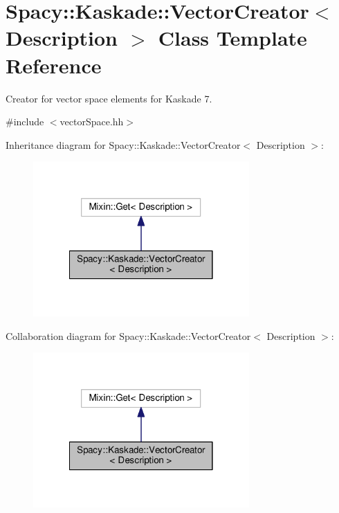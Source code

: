 \hypertarget{classSpacy_1_1Kaskade_1_1VectorCreator}{\section{Spacy\-:\-:Kaskade\-:\-:Vector\-Creator$<$ Description $>$ Class Template Reference}
\label{classSpacy_1_1Kaskade_1_1VectorCreator}
}


Creator for vector space elements for Kaskade 7.  




{\ttfamily \#include $<$vector\-Space.\-hh$>$}



Inheritance diagram for Spacy\-:\-:Kaskade\-:\-:Vector\-Creator$<$ Description $>$\-:
\nopagebreak
\begin{figure}[H]
\begin{center}
\leavevmode
\includegraphics[width=234pt]{classSpacy_1_1Kaskade_1_1VectorCreator__inherit__graph}
\end{center}
\end{figure}


Collaboration diagram for Spacy\-:\-:Kaskade\-:\-:Vector\-Creator$<$ Description $>$\-:
\nopagebreak
\begin{figure}[H]
\begin{center}
\leavevmode
\includegraphics[width=234pt]{classSpacy_1_1Kaskade_1_1VectorCreator__coll__graph}
\end{center}
\end{figure}
